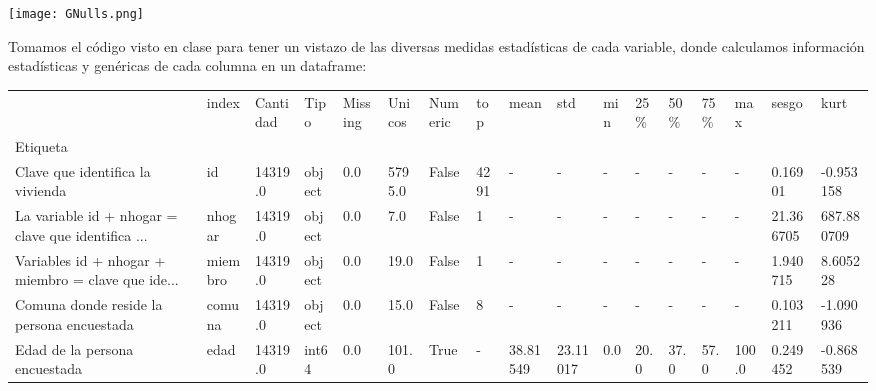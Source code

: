 \documentclass[a4paper]{article}
\begin{document}
    \texttt{[image: GNulls.png]}

    Tomamos el código visto en clase para tener un vistazo de las diversas medidas estadísticas de cada variable, donde calculamos información estadísticas y genéricas de cada columna en un dataframe:

    \begin{landscape}
    \resizebox{24cm}{!} {
    \begin{tabular}{lllllllllllllllll}
        \toprule
        {} &                        index & Cantidad &     Tipo & Missing &  Unicos & Numeric &                            top &          mean &           std &  min &      25\% &      50\% &      75\% &        max &      sesgo &        kurt \\
        Etiqueta                                           &                              &          &          &         &         &         &                                &               &               &      &          &          &          &            &            &             \\
        \midrule
        Clave que identifica la vivienda                   &                           id &  14319.0 &   object &     0.0 &  5795.0 &   False &                           4291 &             - &             - &    - &        - &        - &        - &          - &    0.16901 &   -0.953158 \\
        La variable id + nhogar = clave que identifica ... &                       nhogar &  14319.0 &   object &     0.0 &     7.0 &   False &                              1 &             - &             - &    - &        - &        - &        - &          - &  21.366705 &  687.880709 \\
        Variables id + nhogar + miembro = clave que ide... &                      miembro &  14319.0 &   object &     0.0 &    19.0 &   False &                              1 &             - &             - &    - &        - &        - &        - &          - &   1.940715 &    8.605228 \\
        Comuna donde reside la persona encuestada          &                       comuna &  14319.0 &   object &     0.0 &    15.0 &   False &                              8 &             - &             - &    - &        - &        - &        - &          - &   0.103211 &   -1.090936 \\
        Edad de la persona encuestada                      &                         edad &  14319.0 &    int64 &     0.0 &   101.0 &    True &                              - &      38.81549 &      23.11017 &  0.0 &     20.0 &     37.0 &     57.0 &      100.0 &   0.249452 &   -0.868539 \\

\end{tabular}}
\end{landscape}
\end{document}
